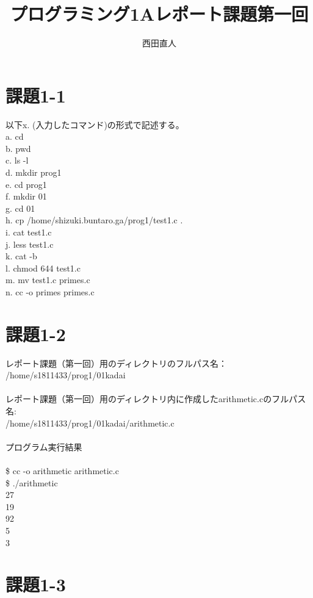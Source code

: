 \documentclass[12pt,a4paper]{jarticle}
\title{プログラミング1Aレポート課題第一回}
\author{西田直人}
\begin{document}
\maketitle

\section{課題1-1}
以下x. (入力したコマンド)の形式で記述する。\\

\noindent a. cd\\
b. pwd\\
c. ls -l\\
d. mkdir prog1\\
e. cd prog1\\
f. mkdir 01\\
g. cd 01\\
h. cp /home/shizuki.buntaro.ga/prog1/test1.c .\\
i. cat test1.c\\
j. less test1.c\\
k. cat -b\\
l. chmod 644 test1.c\\
m. mv test1.c primes.c\\
n. cc -o primes primes.c\\

\section{課題1-2}

レポート課題（第一回）用のディレクトリのフルパス名：\\
\quad /home/s1811433/prog1/01kadai\\
\\
レポート課題（第一回）用のディレクトリ内に作成したarithmetic.cのフルパス名:\\
\quad /home/s1811433/prog1/01kadai/arithmetic.c\\
\\
プログラム実行結果\\
\\
\$ cc -o arithmetic arithmetic.c\\
\$ ./arithmetic\\
27\\
19\\
92\\
5\\
3\\

\section{課題1-3}
\end{document}

